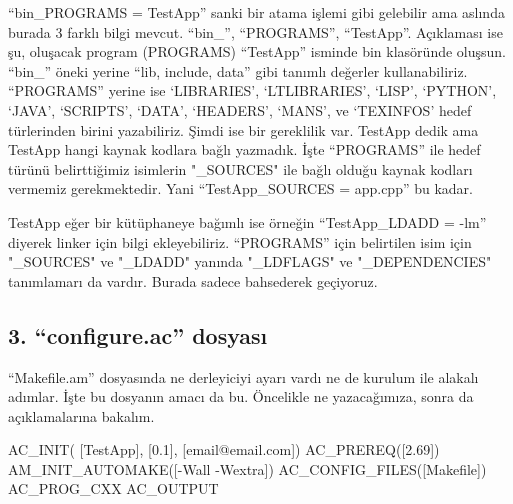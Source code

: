 \documentclass[
]{book}
\newenvironment{Shaded}{\begin{snugshade}}{\end{snugshade}}
\newcommand{\ExtensionTok}[1]{#1}
\newcommand{\NormalTok}[1]{#1}
\begin{document}
``bin\_PROGRAMS = TestApp'' sanki bir atama işlemi gibi gelebilir ama aslında burada 3 farklı bilgi mevcut. ``bin\_'', ``PROGRAMS'', ``TestApp''. Açıklaması ise şu, oluşacak program (PROGRAMS) ``TestApp'' isminde bin klasöründe oluşsun. ``bin\_'' öneki yerine ``lib, include, data'' gibi tanımlı değerler kullanabiliriz. ``PROGRAMS'' yerine ise `LIBRARIES', `LTLIBRARIES', `LISP', `PYTHON', `JAVA', `SCRIPTS', `DATA', `HEADERS', `MANS', ve `TEXINFOS' hedef türlerinden birini yazabiliriz. Şimdi ise bir gereklilik var. TestApp dedik ama TestApp hangi kaynak kodlara bağlı yazmadık. İşte ``PROGRAMS'' ile hedef türünü belirttiğimiz isimlerin "\_SOURCES" ile bağlı olduğu kaynak kodları vermemiz gerekmektedir. Yani ``TestApp\_SOURCES = app.cpp'' bu kadar.

TestApp eğer bir kütüphaneye bağımlı ise örneğin ``TestApp\_LDADD = -lm'' diyerek linker için bilgi ekleyebiliriz. ``PROGRAMS'' için belirtilen isim için "\_SOURCES" ve "\_LDADD" yanında "\_LDFLAGS" ve "\_DEPENDENCIES" tanımlamarı da vardır. Burada sadece bahsederek geçiyoruz.

\hypertarget{configure.ac-dosyasux131}{%
\subsection*{3. ``configure.ac'' dosyası}\label{configure.ac-dosyasux131}}

``Makefile.am'' dosyasında ne derleyiciyi ayarı vardı ne de kurulum ile alakalı adımlar. İşte bu dosyanın amacı da bu. Öncelikle ne yazacağımıza, sonra da açıklamalarına bakalım.

\begin{Shaded}
\begin{Highlighting}[]
\ExtensionTok{AC\_INIT}\NormalTok{( [TestApp], [0.1], [email@email.com])}
\ExtensionTok{AC\_PREREQ}\NormalTok{([2.69])  }
\ExtensionTok{AM\_INIT\_AUTOMAKE}\NormalTok{([{-}Wall {-}Wextra])}
\ExtensionTok{AC\_CONFIG\_FILES}\NormalTok{([Makefile])}
\ExtensionTok{AC\_PROG\_CXX} 
\ExtensionTok{AC\_OUTPUT} 
\end{Highlighting}
\end{Shaded}
\end{document}
